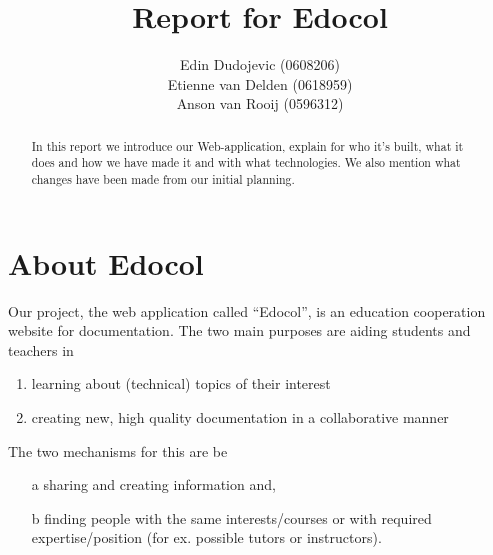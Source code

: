 \documentclass[12pt,a4paper]{article}
\begin{document}
	
	
	\title{Report for Edocol}
	
	\author{Edin Dudojevic (0608206) \\
          Etienne van Delden (0618959) \\
          Anson van Rooij (0596312)}
		
	
	
	\begin{abstract}
		In this report we introduce our Web-application, explain for who it's built,
    what it does and how we have made it and with what technologies. We also mention
    what changes have been made from our initial planning. 
	\end{abstract}
		
	\maketitle
	
	
	   
	
	
	
	\section{About Edocol}
    Our project, the web application called ``Edocol'',
    is an education cooperation website for documentation. The two 
    main purposes are aiding students and teachers in
    \begin{enumerate}
      \item learning about (technical) topics of their interest
      \item creating new, high quality documentation in a collaborative manner
    \end{enumerate}
    The two mechanisms for this are be
    \begin{enumerate}
      \item[a] sharing and creating information and,
      \item[b] finding people with the same interests/courses or with required 
      expertise/position (for ex. possible tutors or instructors).
    \end{enumerate}
\end{document}
